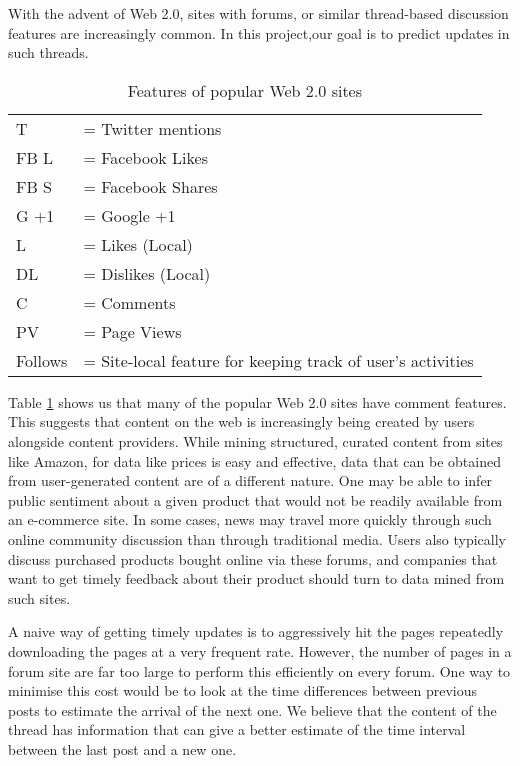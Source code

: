 With the advent of Web 2.0, sites with forums, or similar thread-based 
discussion features are increasingly common.
In this project,our goal is to predict updates in such threads.
\begin{table}\label{table:web20}
	{\footnotesize
\caption{Features of popular Web 2.0 sites}
	\begin{tabular}{l l}
		T &= Twitter mentions\\
	 FB L &= Facebook Likes \\
		FB S &= Facebook Shares\\
	G +1 &= Google +1\\
		   L&= Likes (Local) \\
   		DL &= Dislikes (Local) \\
			C &= Comments \\
		PV &= Page Views \\
   Follows &= Site-local feature for keeping track of user's activities
	\end{tabular}
}
\end{table}

Table \ref{table:web20} shows us that many of the popular Web 2.0 sites have 
comment features. This suggests that content on the web is increasingly being 
created by users alongside content providers. While mining structured, curated 
content from sites like Amazon, for data like prices is easy and effective, data 
that can be obtained from user-generated content are of a different nature. One 
may be able to infer public sentiment about a given product that would not be 
readily available from an e-commerce site.
 In some cases, news may travel more quickly through such online community 
discussion than through traditional media. Users also typically discuss 
purchased products bought online via these forums, and companies that want to 
get timely feedback about their product should turn to data mined from such 
sites.

 A naive way of getting timely updates is to aggressively hit the pages 
repeatedly downloading the pages at a very frequent rate. However, the number of 
pages in a forum site are far too large to perform this efficiently on every 
forum. One way to minimise this cost would be to look at the time differences 
between previous posts to estimate the arrival of the next one. We believe that 
the content of the thread has information that can give a better estimate of the 
time interval between the last post and a new one.


